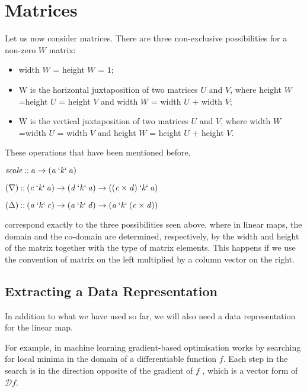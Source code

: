\documentclass[11pt,a4]{article}
\newcommand{\Varid}[1]{\mathit{#1}}
\theoremstyle{definition}
\theoremstyle{Definition}
\theoremstyle{Definition}
\begin{document}
	\newpage
	
	\section{Matrices}
	Let us now consider matrices. There are three non-exclusive possibilities for a non-zero $W$ matrix:
	\begin{itemize}
		\item width $W$ = height $W$ = $1$;
		\item W is the horizontal juxtaposition of two matrices $U$ and $V$, where height $W$ =\newline height $U$ = height $V$ and width $W$ = width $U$ $+$ width $V$;
		\item W is the vertical juxtaposition of two matrices $U$ and $V$, where width $W$ =\newline width $U$ = width $V$ and height $W$ = height $U$ $+$ height $V$.
	\end{itemize}
	
	These operations that have been mentioned before,

	\ensuremath{\Varid{scale}\mathbin{::}\Varid{a}\rightarrow (\Varid{a}\mathbin{`\Varid{k}`}\Varid{a})}
    
    \ensuremath{( \nabla )\mathbin{::}(\Varid{c}\mathbin{`\Varid{k}`}\Varid{a})\rightarrow (\Varid{d}\mathbin{`\Varid{k}`}\Varid{a})\rightarrow ((\Varid{c} \times \Varid{d})\mathbin{`\Varid{k}`}\Varid{a})}

    \ensuremath{( \Delta )\mathbin{::}(\Varid{a}\mathbin{`\Varid{k}`}\Varid{c})\rightarrow (\Varid{a}\mathbin{`\Varid{k}`}\Varid{d})\rightarrow (\Varid{a}\mathbin{`\Varid{k}`}(\Varid{c} \times \Varid{d}))}	
    

	correspond exactly to the three possibilities seen above, where in linear maps, the domain and the co-domain are determined, respectively, by the width and height of the matrix together with the type of matrix elements. This happens if we use the convention of matrix on the left multiplied by a column vector on the right.
	
	\subsection{Extracting a Data Representation}
	
	In addition to what we have used so far, we will also need a data representation for the linear map.
	
	For example, in machine learning gradient-based optimisation works by searching for local
	minima in the domain of a differentiable function $f$. Each step in the search is in the direction opposite of the gradient of $f$ ,
	which is a vector form of $\mathcal{D} f$.
	
\end{document}
